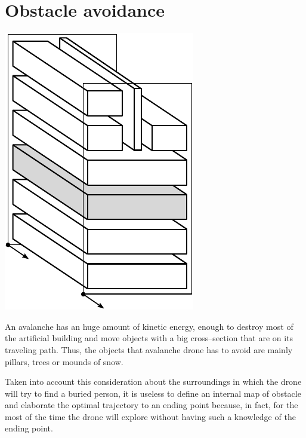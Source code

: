 
\section{Obstacle avoidance}
\begin{marginfigure}
	\centering
	\includegraphics[scale=0.5]{ch3/img/PA_map_obstacle.pdf}
\end{marginfigure}
An avalanche has an huge amount of kinetic energy, enough to destroy most of the artificial building and move objects with a big cross--section that are on its traveling path. Thus, the objects that avalanche drone has to avoid are mainly pillars, trees or mounds of snow.

Taken into account this consideration about the surroundings in which the drone will try to find a buried person, it is useless to define an internal map of obstacle and elaborate the optimal trajectory to an ending point because, in fact, for the most of the time the drone will explore without having such a knowledge of the ending point.

